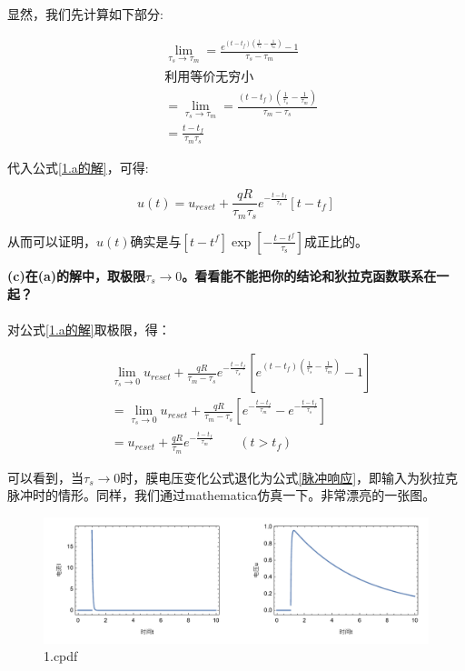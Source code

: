 \documentclass[12pt, a4paper, oneside]{ctexbook}
\begin{document}
显然，我们先计算如下部分:

\begin{equation}
    \begin{aligned}
        &\lim_{\tau_s\to\tau_m}=\frac{e^{(t-t_f)(\frac{1}{\tau_s}-\frac{1}{\tau_m})}-1}{\tau_s-\tau_m}\\
        &\text{利用等价无穷小}\\
        &=\lim_{\tau_s\to\tau_m}=\frac{(t-t_f)(\frac{1}{\tau_s}-\frac{1}{\tau_m})}{\tau_m-\tau_s}\\
        &=\frac{t-t_f}{\tau_m\tau_s}
    \end{aligned}
\end{equation}

代入公式\ref*{1.a的解}，可得:

\begin{equation}
    u(t)=u_{reset}+\frac{qR}{\tau_m\tau_s}e^{-\frac{t-t_f}{\tau_s}}[t-t_f]
\end{equation}

从而可以证明，$u(t)$确实是与$[t-t^{f}]\exp[-\frac{t-t^{f}}{\tau_\text{s}}]$成正比的。

\textbf{(c)在(a)的解中，取极限$\tau_s\to0$。看看能不能把你的结论和狄拉克函数联系在一起？}\\\\

对公式\ref*{1.a的解}取极限，得：

\begin{equation}
    \begin{aligned}
        &\lim_{\tau_s\to0}u_{reset}+\frac{qR}{\tau_m-\tau_s}e^{-\frac{t-t_f}{\tau_s}}[e^{(t-t_f)(\frac{1}{\tau_s}-\frac{1}{\tau_m})}-1]\\
        &=\lim_{\tau_s\to0}u_{reset}+\frac{qR}{\tau_m-\tau_s}[e^{-\frac{t-t_f}{\tau_m}}-e^{-\frac{t-t_f}{\tau_s}}]\\
        &=u_{reset}+\frac{qR}{\tau_m}e^{-\frac{t-t_f}{\tau_m}}\qquad(t>t_f)
    \end{aligned}
\end{equation}

可以看到，当$\tau_s\to0$时，膜电压变化公式退化为公式\ref*{脉冲响应}，即输入为狄拉克脉冲时的情形。同样，我们通过mathematica仿真一下。非常漂亮的一张图。

\begin{figure}[H]
    \centering
    \includegraphics[width=1\textwidth]{exercise/1.c.pdf}
    \caption{1.cpdf}
\end{figure}
\end{document}

